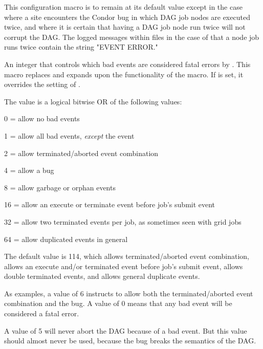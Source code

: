 \begin{description}
  This configuration macro is to remain at its default value 
  except in the case
  where a site encounters the Condor bug in which DAG job nodes
  are executed twice,
  and where it is certain
  that having a DAG job node run twice will not corrupt the DAG.
  The logged messages within  files
  in the case of that a node job runs twice
  contain the string
  "EVENT ERROR."

\label{param:DAGManAllowEvents}
\item[\Macro{DAGMAN\_ALLOW\_EVENTS}]
  An integer that controls which bad events are considered
  fatal errors by .  This macro replaces and expands
  upon the functionality of the
   macro.
  If  is set, it overrides the
  setting of .

  The  value is a logical bitwise OR of the
  following values:
  \begin{description}
  \item 0 = allow no bad events
  \item 1 = allow all bad events, \emph{except} the event
  \item 2 = allow terminated/aborted event combination
  \item 4 = allow a  bug
  \item 8 = allow garbage or orphan events
  \item 16 = allow an execute or terminate event before job's submit event
  \item 32 = allow two terminated events per job, as sometimes seen
    with grid jobs
  \item 64 = allow duplicated events in general
  \end{description}

  The default value is 114, which allows terminated/aborted event combination,
  allows an execute and/or terminated event before job's submit event,
  allows double terminated events, and allows general duplicate events.

  As examples, a value of 6 instructs  to allow both
  the terminated/aborted event combination and the 
   bug.
  A value of 0 means that any bad event will be considered a fatal error.

  A value of 5 will never abort the DAG because of a bad event.
  But this value should almost never be used,
  because the  
  bug breaks the semantics of the DAG.


\end{description}
